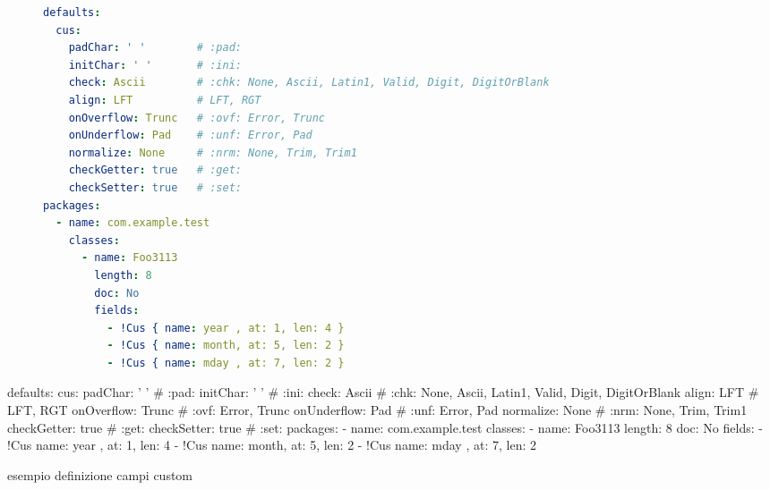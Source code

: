 \ifesource
\begin{figure*}[!htb]
\begin{lstlisting}[language=yaml, caption={esempio definizione campi custom}, 
label=lst:xmplCus]
defaults:
  cus:
    padChar: ' '        # :pad:
    initChar: ' '       # :ini:
    check: Ascii        # :chk: None, Ascii, Latin1, Valid, Digit, DigitOrBlank
    align: LFT          # LFT, RGT
    onOverflow: Trunc   # :ovf: Error, Trunc
    onUnderflow: Pad    # :unf: Error, Pad
    normalize: None     # :nrm: None, Trim, Trim1
    checkGetter: true   # :get:
    checkSetter: true   # :set:
packages:
  - name: com.example.test
    classes:
      - name: Foo3113
        length: 8
        doc: No
        fields:
          - !Cus { name: year , at: 1, len: 4 }
          - !Cus { name: month, at: 5, len: 2 }
          - !Cus { name: mday , at: 7, len: 2 }
\end{lstlisting}
\end{figure*}
\else
\begin{elisting}[!htb]
\begin{yamlcode}
defaults:
  cus:
    padChar: ' '        # :pad:
    initChar: ' '       # :ini:
    check: Ascii        # :chk: None, Ascii, Latin1, Valid, Digit, DigitOrBlank
    align: LFT          # LFT, RGT
    onOverflow: Trunc   # :ovf: Error, Trunc
    onUnderflow: Pad    # :unf: Error, Pad
    normalize: None     # :nrm: None, Trim, Trim1
    checkGetter: true   # :get:
    checkSetter: true   # :set:
packages:
  - name: com.example.test
    classes:
      - name: Foo3113
        length: 8
        doc: No
        fields:
          - !Cus { name: year , at: 1, len: 4 }
          - !Cus { name: month, at: 5, len: 2 }
          - !Cus { name: mday , at: 7, len: 2 }
\end{yamlcode}
\caption{esempio definizione campi custom}
\label{lst:xmplCus}
\end{elisting}
\fi


